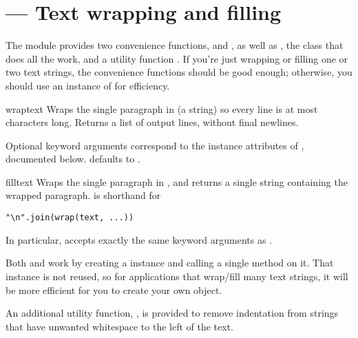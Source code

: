 \section{ ---
         Text wrapping and filling}



The  module provides two convenience functions,
 and , as well as
, the class that does all the work, and a utility function 
.  If you're just wrapping or filling one or two 
text strings, the convenience functions should be good enough; otherwise, 
you should use an instance of  for efficiency.

\begin{funcdesc}{wrap}{text}
Wraps the single paragraph in  (a string) so every line is at
most  characters long.  Returns a list of output lines,
without final newlines.

Optional keyword arguments correspond to the instance attributes of
, documented below.   defaults to
.
\end{funcdesc}

\begin{funcdesc}{fill}{text}
Wraps the single paragraph in , and returns a single string
containing the wrapped paragraph.   is shorthand for
\begin{verbatim}
"\n".join(wrap(text, ...))
\end{verbatim}

In particular,  accepts exactly the same keyword
arguments as .
\end{funcdesc}

Both  and  work by creating a
 instance and calling a single method on it.  That
instance is not reused, so for applications that wrap/fill many text
strings, it will be more efficient for you to create your own
 object.

An additional utility function, , is provided to
remove indentation from strings that have unwanted whitespace to the
left of the text.


